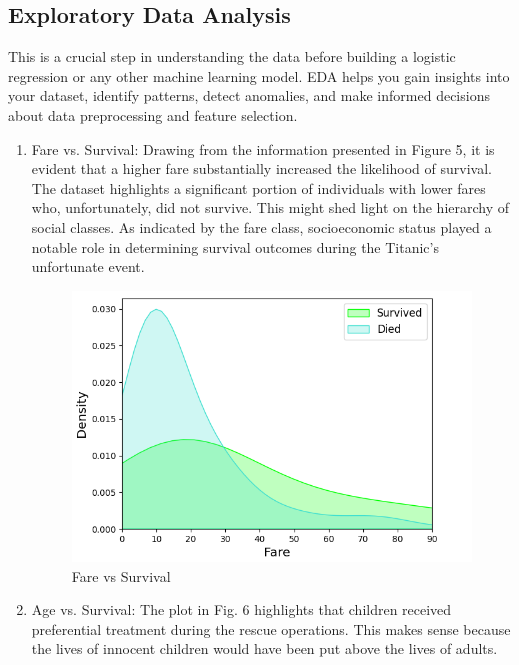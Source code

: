 \documentclass[conference]{IEEEtran}
\begin{document}
\subsection{Exploratory Data Analysis}
This is a crucial step in understanding the data before building a logistic regression or any other machine learning model. EDA helps you gain insights into your dataset, identify patterns, detect anomalies, and make informed decisions about data preprocessing and feature selection. 
\begin{enumerate}
    \item Fare vs. Survival: Drawing from the information presented in Figure 5, it is evident that a higher fare substantially increased the likelihood of survival. The dataset highlights a significant portion of individuals with lower fares who, unfortunately, did not survive. This might shed light on the hierarchy of social classes. As indicated by the fare class, socioeconomic status played a notable role in determining survival outcomes during the Titanic’s unfortunate event.
    \begin{figure}[htbp]
    \centerline{\includegraphics[scale = 0.56]{Fare versus Survival.png}}
    \caption{Fare vs Survival}
    \label{fig}
    \end{figure}
    \item Age vs. Survival: The plot in Fig. 6 highlights that children received preferential treatment during the rescue operations. This makes sense because the lives of innocent children would have been put above the lives of adults.
    \begin{figure}[htbp]

\end{figure}
\end{enumerate}
\end{document}
